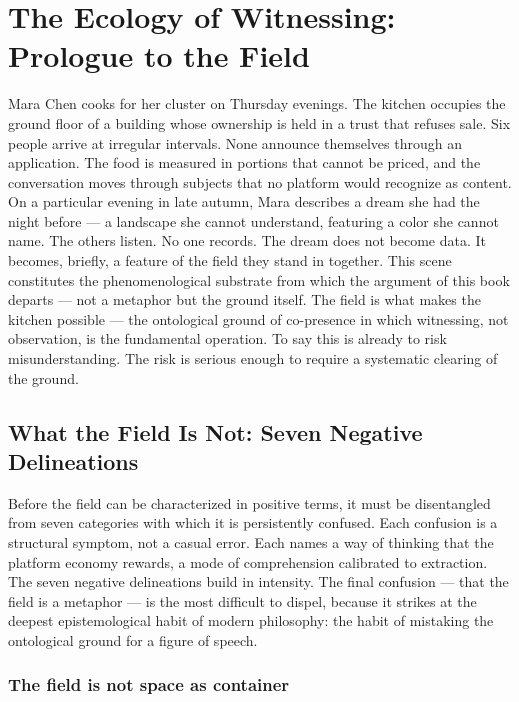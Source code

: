 \chapter{The Ecology of Witnessing: Prologue to the Field}
\label{ch:00}

Mara Chen cooks for her cluster on Thursday evenings. The kitchen occupies the ground floor of a building whose ownership is held in a trust that refuses sale. Six people arrive at irregular intervals. None announce themselves through an application. The food is measured in portions that cannot be priced, and the conversation moves through subjects that no platform would recognize as content. On a particular evening in late autumn, Mara describes a dream she had the night before — a landscape she cannot understand, featuring a color she cannot name. The others listen. No one records. The dream does not become data. It becomes, briefly, a feature of the field they stand in together. This scene constitutes the phenomenological substrate from which the argument of this book departs — not a metaphor but the ground itself. The field is what makes the kitchen possible — the ontological ground of co-presence in which witnessing, not observation, is the fundamental operation. To say this is already to risk misunderstanding. The risk is serious enough to require a systematic clearing of the ground.

\section{What the Field Is Not: Seven Negative Delineations}

Before the field can be characterized in positive terms, it must be disentangled from seven categories with which it is persistently confused. Each confusion is a structural symptom, not a casual error. Each names a way of thinking that the platform economy rewards, a mode of comprehension calibrated to extraction. The seven negative delineations build in intensity. The final confusion — that the field is a metaphor — is the most difficult to dispel, because it strikes at the deepest epistemological habit of modern philosophy: the habit of mistaking the ontological ground for a figure of speech.

\subsection{The field is not space as container}

